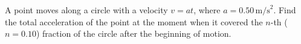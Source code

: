 
\item A point moves along a circle with a velocity \( v = at \), where \( a = 0.50 \, \text{m/s}^2 \). Find the total acceleration of the point at the moment when it covered the \( n \)-th (\( n = 0.10 \)) fraction of the circle after the beginning of motion.

